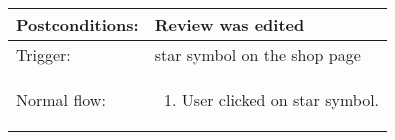 \begin{longtable}{| p{3.5cm} | p{9cm} |}
\hline
Postconditions: & Review was edited \\
\hline
Trigger: &  star symbol on the shop page\\
\hline
Normal flow: &\mbox{}\par\vspace{-\baselineskip}
\begin{enumerate}
\item User clicked on star symbol.
\end{enumerate}\\
\hline
\end{longtable}






